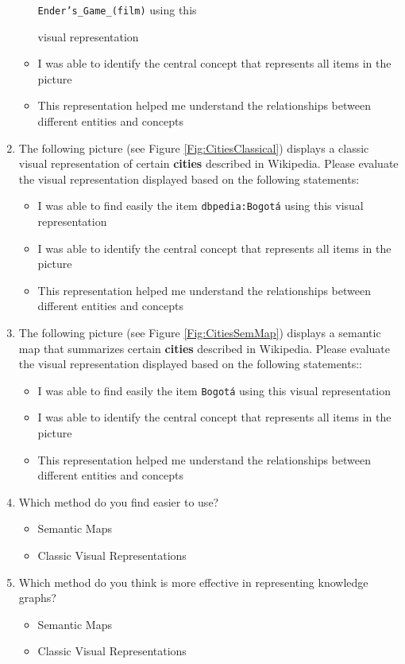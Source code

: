 \documentclass{ieeeaccess}
\begin{document}
\begin{enumerate}
\begin{itemize}
        \texttt{Ender's\_Game\_(film)} using this 
        
        visual representation
        \item I was able to identify the central concept that represents all items in the picture
        \item This representation helped me understand the relationships between different entities and concepts
    \end{itemize}
    \item The following picture (see Figure \ref{Fig:CitiesClassical})
    displays a classic visual representation of 
    certain \textbf{cities} 
    described in Wikipedia. Please evaluate the 
    visual representation displayed based on the 
    following statements:
    \begin{itemize}
        \item I was able to find easily the item
        \texttt{dbpedia:Bogotá} using this 
        visual representation
        \item I was able to identify the central concept that represents all items in the picture
        \item This representation helped me understand the relationships between different entities and concepts
    \end{itemize}
    \item The following picture (see Figure \ref{Fig:CitiesSemMap})
    displays a semantic map that summarizes 
    certain \textbf{cities} 
    described in Wikipedia. Please evaluate the visual representation displayed based on the 
    following statements::
    \begin{itemize}
        \item I was able to find easily the item
        \texttt{Bogotá} using this visual representation
        \item I was able to identify the central concept that represents all items in the picture
        \item This representation helped me understand the relationships between different entities and concepts
    \end{itemize}
    \item Which method do you find easier to use?
    \begin{itemize}
        \item Semantic Maps
        \item Classic Visual Representations
    \end{itemize}
    \item Which method do you think is more effective in representing knowledge graphs?
    \begin{itemize}
        \item Semantic Maps
        \item Classic Visual Representations
    \end{itemize}
\end{enumerate}
\end{document}
